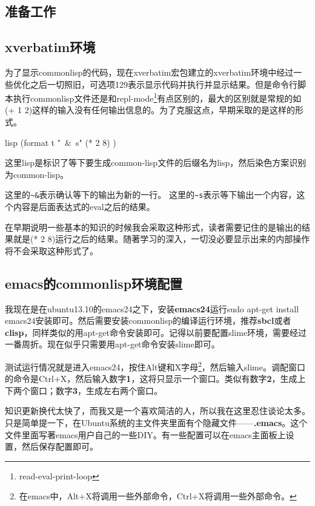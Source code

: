 \documentclass[11pt,oneside]{book}
\begin{document}
\begin{common-format}
\mainmatter

\chapter{准备工作}
\section{xverbatim环境}
为了显示commonlisp的代码，现在xverbatim宏包建立的xverbatim环境中经过一些优化之后一切照旧，可选项129表示显示代码并执行并显示结果。但是命令行脚本执行commonlisp文件还是和repl-mode\footnote{read-eval-print-loop}有点区别的，最大的区别就是常规的如(+ 1 2)这样的输入没有任何输出信息的。为了克服这点，早期采取的是这样的形式。
\begin{xverbatim}[129]{lisp}
(format t "~&~s" (* 2 8) )
\end{xverbatim}
这里lisp是标识了等下要生成common-lisp文件的后缀名为lisp，然后染色方案识别为common-lisp。

这里的\verb+~&+表示确认等下的输出为新的一行。
这里的\verb+~s+表示等下输出一个内容，这个内容是后面表达式的eval之后的结果。

在早期说明一些基本的知识的时候我会采取这种形式，读者需要记住的是输出的结果就是(* 2 8)运行之后的结果。随著学习的深入，一切没必要显示出来的内部操作将不会采取这种形式了。

\section{emacs的commonlisp环境配置}
我现在是在ubuntu13.10的emacs24之下，安装\textbf{emacs24}运行sudo apt-get install emacs24安装即可。然后需要安装commonlisp的编译运行环境，推荐\textbf{sbcl}或者\textbf{clisp}，同样类似的用apt-get命令安装即可。记得以前要配置slime环境，需要经过一番周折。现在似乎只需要用apt-get命令安装slime即可。

测试运行情况就是进入emacs24，按住Alt键和X字母\footnote{在emacs中，Alt+X将调用一些外部命令，Ctrl+X将调用一些外部命令。}，然后输入slime。调配窗口的命令是Ctrl+X，然后输入数字\textbf{1}，这将只显示一个窗口。类似有数字\textbf{2}，生成上下两个窗口；数字\textbf{3}，生成左右两个窗口。

知识更新换代太快了，而我又是一个喜欢简洁的人，所以我在这里忍住谈论太多。只是简单提一下，在Ubuntu系统的主文件夹里面有个隐藏文件——\textbf{.emacs}。这个文件里面写著emacs用户自己的一些DIY。有一些配置可以在emacs主面板上设置，然后保存配置即可。


\end{common-format}
\end{document}
